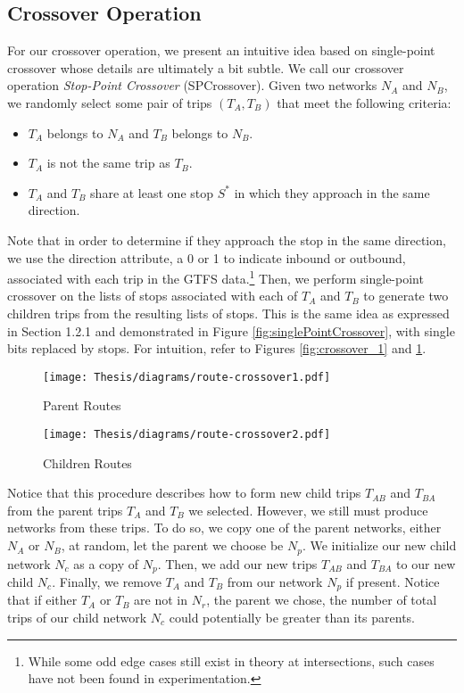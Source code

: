 \documentclass[11pt]{amsart}
\theoremstyle{definition}                  %
\theoremstyle{remark}                       %
\numberwithin{equation}{section}
\begin{document}
\subsection{Crossover Operation}
For our crossover operation, we present an intuitive idea based on single-point crossover whose details are ultimately a bit subtle. We call our crossover operation \textit{Stop-Point Crossover} (SPCrossover). Given two networks $N_A$ and $N_B$, we randomly select some pair of trips $(T_A, T_B)$ that meet the following criteria: 
\begin{itemize}
    \item $T_A$ belongs to $N_A$ and $T_B$ belongs to $N_B$. 
    \item $T_A$ is not the same trip as $T_B$. 
    \item $T_A$ and $T_B$ share at least one stop $S^*$ in which they approach in the same direction. 
\end{itemize}
Note that in order to determine if they approach the stop in the same direction, we use the direction attribute, a 0 or 1 to indicate inbound or outbound, associated with each trip in the GTFS data.\footnote{While some odd edge cases still exist in theory at intersections, such cases have not been found in experimentation.} Then, we perform single-point crossover on the lists of stops associated with each of $T_A$ and $T_B$ to generate two children trips from the resulting lists of stops. This is the same idea as expressed in Section 1.2.1 and demonstrated in Figure \ref{fig:singlePointCrossover}, with single bits  replaced by stops. For intuition, refer to Figures \ref{fig:crossover_1} and \ref{fig:crossover_2}.
\begin{figure}[h]
\centering
\begin{minipage}{.5\textwidth}
  \centering
  \texttt{[image: Thesis/diagrams/route-crossover1.pdf]}
  \caption{Parent Routes}
  \label{fig:crossover_1}
\end{minipage}%
\begin{minipage}{.5\textwidth}
  \centering
  \texttt{[image: Thesis/diagrams/route-crossover2.pdf]}
  \caption{Children Routes}
  \label{fig:crossover_2}
\end{minipage}
\end{figure}

Notice that this procedure describes how to form new child trips $T_{AB}$ and $T_{BA}$ from the parent trips $T_A$ and $T_B$ we selected. However, we still must produce networks from these trips. To do so, we copy one of the parent networks, either $N_A$ or $N_B$, at random, let the parent we choose be $N_p$. We initialize our new child network $N_c$ as a copy of $N_p$. Then, we add our new trips $T_{AB}$ and $T_{BA}$ to our new child $N_c$.  Finally, we remove $T_{A}$ and $T_{B}$ from our network $N_p$ if present. Notice that if either $T_{A}$ or $T_{B}$ are not in $N_r$, the parent we chose, the number of total trips of our child network $N_c$ could potentially be greater than its parents. 
\end{document}
